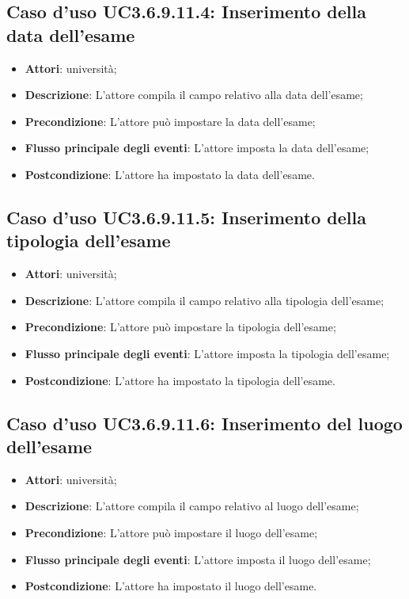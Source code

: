\subsection{Caso d'uso \texorpdfstring{UC3.6.9.11.4}{UC3.6.9.11.4}: Inserimento della data dell’esame}
\begin{itemize}
\item \textbf{Attori}: università;
\item \textbf{Descrizione}: L'attore compila il campo relativo alla data dell’esame;

\item \textbf{Precondizione}: L'attore può impostare la data dell’esame;

\item \textbf{Flusso principale degli eventi}: L'attore imposta la data dell’esame;

\item \textbf{Postcondizione}: L'attore ha impostato la data dell’esame.

\end{itemize}
\subsection{Caso d'uso \texorpdfstring{UC3.6.9.11.5}{UC3.6.9.11.5}: Inserimento della tipologia dell’esame}
\begin{itemize}
\item \textbf{Attori}: università;
\item \textbf{Descrizione}: L'attore compila il campo relativo alla tipologia dell’esame;

\item \textbf{Precondizione}: L'attore può impostare la tipologia dell’esame;

\item \textbf{Flusso principale degli eventi}: L'attore imposta la tipologia dell’esame;

\item \textbf{Postcondizione}: L'attore ha impostato la tipologia dell’esame.

\end{itemize}
\subsection{Caso d'uso \texorpdfstring{UC3.6.9.11.6}{UC3.6.9.11.6}: Inserimento del luogo dell’esame}
\begin{itemize}
\item \textbf{Attori}: università;
\item \textbf{Descrizione}: L'attore compila il campo relativo al luogo dell’esame;

\item \textbf{Precondizione}: L'attore può impostare il luogo dell’esame;

\item \textbf{Flusso principale degli eventi}: L'attore imposta il luogo dell’esame;

\item \textbf{Postcondizione}: L'attore ha impostato il luogo dell’esame.

\end{itemize}
